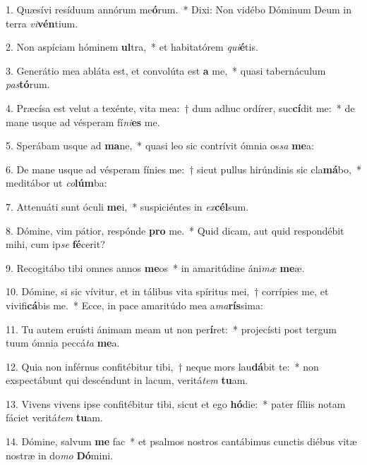 ﻿1. Quæsívi resíduum annórum me\textbf{ó}rum.~* Dixi: Non vidébo Dóminum Deum in terra \textit{vi}\textbf{vén}tium.

2. Non aspíciam hóminem \textbf{ul}tra,~* et habitatórem \textit{qui}\textbf{é}tis.

3. Generátio mea abláta est, et convolúta est \textbf{a} me,~* quasi tabernáculum \textit{pas}\textbf{tó}rum.

4. Præcísa est velut a texénte, vita mea:~† dum adhuc ordírer, suc\textbf{cí}dit me:~* de mane usque ad vésperam fí\textit{ni}\textbf{es} me.

5. Sperábam usque ad \textbf{ma}ne,~* quasi leo sic contrívit ómnia os\textit{sa} \textbf{me}a:

6. De mane usque ad vésperam fínies me:~† sicut pullus hirúndinis sic cla\textbf{má}bo,~* meditábor ut \textit{co}\textbf{lúm}ba:

7. Attenuáti sunt óculi \textbf{me}i,~* suspiciéntes in \textit{ex}\textbf{cél}sum.

8. Dómine, vim pátior, respónde \textbf{pro} me.~* Quid dicam, aut quid respondébit mihi, cum ip\textit{se} \textbf{fé}cerit?

9. Recogitábo tibi omnes annos \textbf{me}os~* in amaritúdine áni\textit{mæ} \textbf{me}æ.

10. Dómine, si sic vívitur, et in tálibus vita spíritus mei,~† corrípies me, et vivifi\textbf{cá}bis me.~* Ecce, in pace amaritúdo mea a\textit{ma}\textbf{rís}sima:

11. Tu autem eruísti ánimam meam ut non per\textbf{í}ret:~* projecísti post tergum tuum ómnia peccá\textit{ta} \textbf{me}a.

12. Quia non inférnus confitébitur tibi,~† neque mors lau\textbf{dá}bit te:~* non exspectábunt qui descéndunt in lacum, veritá\textit{tem} \textbf{tu}am.

13. Vivens vivens ipse confitébitur tibi, sicut et ego \textbf{hó}die:~* pater fíliis notam fáciet veritá\textit{tem} \textbf{tu}am.

14. Dómine, salvum \textbf{me} fac~* et psalmos nostros cantábimus cunctis diébus vitæ nostræ in do\textit{mo} \textbf{Dó}mini.

